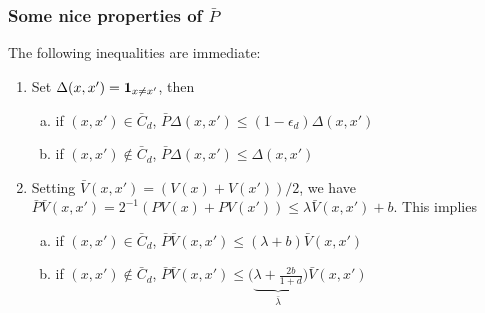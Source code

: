 \documentclass[english,graybox,envcountchap,envcountsame,sectrefs,shortlabels]{svmono}
\theoremstyle{style}
\begin{document}
\subsubsection*{Some nice properties of $\bar P$}
The following inequalities are immediate:
\begin{enumerate}
\item Set $\Delta(x,x')=\mathbf{1}_{x\neq x'}$, then
\begin{enumerate}[(a)]
\item if $(x,x') \in \bar C_d$, $\bar P \Delta(x,x') \leq (1-\epsilon_d) \Delta(x,x')$
\item if $(x,x') \notin \bar C_d$, $\bar P \Delta(x,x') \leq \Delta(x,x')$
\end{enumerate}
\item Setting $\bar V(x,x')=(V(x)+V(x'))/2$, we have $\bar P \bar V(x,x')=2^{-1}(PV(x)+PV(x'))\leq \lambda \bar V(x,x')+b$. This implies
\begin{enumerate}[(a)]
\item if $(x,x') \in \bar C_d$, $\bar P \bar V(x,x') \leq (\lambda+b) \bar V(x,x')$
\item if $(x,x') \notin \bar C_d$, $\bar P \bar V(x,x') \leq \big(\underbrace{\lambda+\frac{2b}{1+d}}_{\bar \lambda}\big)\bar V(x,x')$
\end{enumerate}
\end{enumerate}
\end{document}
